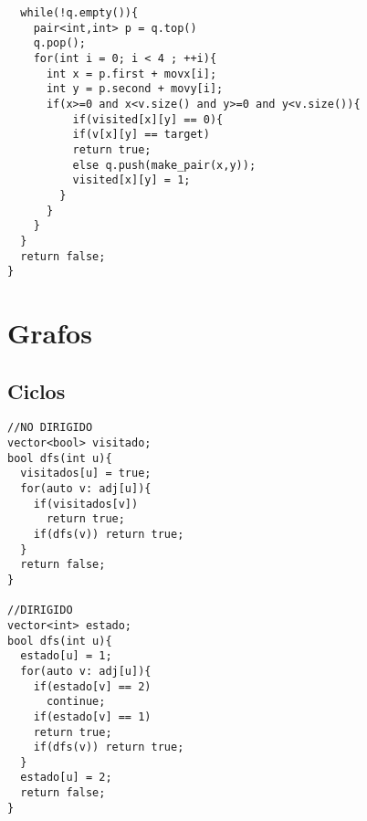 \documentclass[twoside]{article}
\begin{document}
\begin{multicols*}{2}
\begin{verbatim}
  while(!q.empty()){
    pair<int,int> p = q.top()
    q.pop();
    for(int i = 0; i < 4 ; ++i){
      int x = p.first + movx[i];
      int y = p.second + movy[i];
      if(x>=0 and x<v.size() and y>=0 and y<v.size()){
          if(visited[x][y] == 0){
          if(v[x][y] == target)
          return true;
          else q.push(make_pair(x,y));
          visited[x][y] = 1;
        }
      } 
    }
  }
  return false;
}

\end{verbatim}

{
[\vspace{2em}]
\section*{Grafos}
}
{
\subsection*{Ciclos}
}
\begin{verbatim}
//NO DIRIGIDO
vector<bool> visitado;
bool dfs(int u){
  visitados[u] = true;
  for(auto v: adj[u]){
    if(visitados[v])
      return true;
    if(dfs(v)) return true;
  }
  return false; 
}

//DIRIGIDO
vector<int> estado;
bool dfs(int u){
  estado[u] = 1;
  for(auto v: adj[u]){
    if(estado[v] == 2)
      continue;
    if(estado[v] == 1)
    return true;
    if(dfs(v)) return true;
  }
  estado[u] = 2;
  return false;
}

\end{verbatim}

{
[\vspace{2em}]
}
\end{multicols*}
\end{document}
